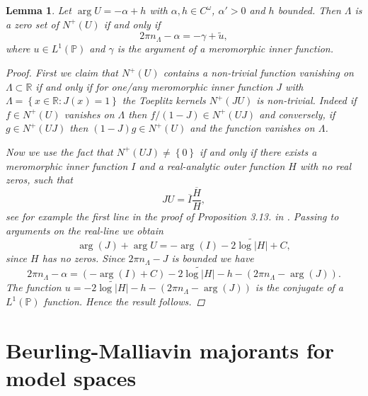 \documentclass{article}[12pt]
\newtheorem{lemma}{Lemma}
\theoremstyle{remark}
\begin{document}
    \begin{lemma}
        Let $\arg U=-\alpha + h$ with $\alpha, h \in C^{\omega}$, $\alpha' >0$ and $h$ bounded. Then $\Lambda$ is a zero set of $N^{+}(U)$ if and only if
        \begin{equation*}
            2\pi n_{\Lambda} - \alpha = -\gamma + \widetilde{u},
        \end{equation*}
        where $u \in L^{1}(\mathbb{P})$ and $\gamma$ is the argument of a meromorphic inner function.
        \begin{proof}
            First we claim that $N^{+}(U)$ contains a non-trivial function vanishing on $\Lambda \subset \mathbb{R}$ if and only if for one/any meromorphic inner function $J$ with $\Lambda = \left\{ x \in \mathbb{R} : J(x) = 1\right\}$ the Toeplitz kernels $N^{+}(JU)$ is non-trivial. Indeed if $f \in N^{+}(U)$ vanishes on $\Lambda$ then $f/(1-J) \in N^{+}(UJ)$ and conversely, if $g \in N^{+}(UJ)$ then $(1-J)g \in N^{+}(U)$ and the function vanishes on $\Lambda$.
            
            Now we use the fact that $N^{+}(UJ) \neq \left\{ 0 \right\}$ if and only if there exists a meromorphic inner function $I$ and a real-analytic outer function $H$ with no real zeros, such that
            \begin{equation*}
                JU = \overline{I}\frac{\overline{H}}{H},
            \end{equation*}
            see for example the first line in the proof of Proposition 3.13. in \cite{MR2215727}. Passing to arguments on the real-line we obtain
            \begin{equation*}
                \arg(J) + \arg U = -\arg(I) - 2\widetilde{\log\lvert H \rvert} + C,
            \end{equation*}
            since $H$ has no zeros. Since $2\pi n_{\Lambda} - J$ is bounded we have
            \begin{equation*}
                2\pi n_{\Lambda}-\alpha = (-\arg(I)+C) - 2\widetilde{\log\lvert H \rvert} - h - (2\pi n_{\Lambda}-\arg(J)).
            \end{equation*}
            The function $u = - 2\widetilde{\log\lvert H \rvert} - h - (2\pi n_{\Lambda}-\arg(J))$ is the conjugate of a $L^{1}(\mathbb{P})$ function. Hence the result follows.
        \end{proof}
    \end{lemma}

\section{Beurling-Malliavin majorants for model spaces}\label{sec:bm_majorants}
\end{document}
